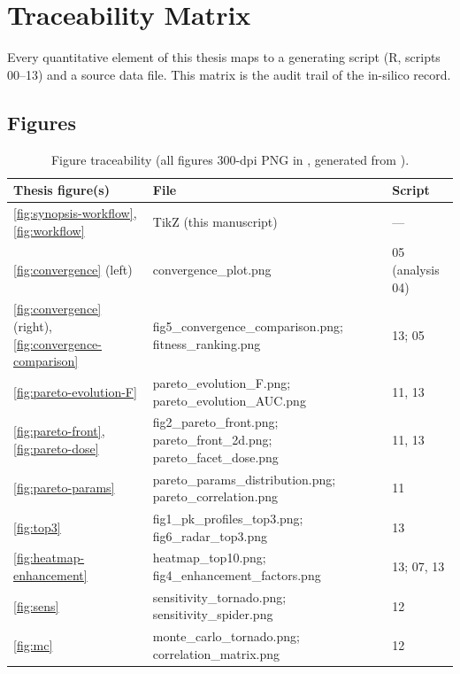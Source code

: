 \chapter{Traceability Matrix}
\label{chap:app-traceability}

Every quantitative element of this thesis maps to a generating script (R, scripts 00--13) and a source data file. This matrix is the audit trail of the in-silico record.

\section{Figures}
\begin{table}[htbp]
\centering
\caption{Figure traceability (all figures 300-dpi PNG in , generated from ).}
\label{tab:trace-figs}
\small
\footnotesize\setlength{\tabcolsep}{4pt}
\begin{tabular}{p{3.1cm}p{7.6cm}p{3.2cm}}
\toprule
Thesis figure(s) & File & Script\\
\midrule
\ref{fig:synopsis-workflow}, \ref{fig:workflow} & TikZ (this manuscript) & ---\\
\ref{fig:convergence} (left) & convergence\_plot.png & 05 (analysis 04)\\
\ref{fig:convergence} (right), \ref{fig:convergence-comparison} & fig5\_convergence\_comparison.png; fitness\_ranking.png & 13; 05\\
\ref{fig:pareto-evolution-F} & pareto\_evolution\_F.png; pareto\_evolution\_AUC.png & 11, 13\\
\ref{fig:pareto-front}, \ref{fig:pareto-dose} & fig2\_pareto\_front.png; pareto\_front\_2d.png; pareto\_facet\_dose.png & 11, 13\\
\ref{fig:pareto-params} & pareto\_params\_distribution.png; pareto\_correlation.png & 11\\
\ref{fig:top3} & fig1\_pk\_profiles\_top3.png; fig6\_radar\_top3.png & 13\\
\ref{fig:heatmap-enhancement} & heatmap\_top10.png; fig4\_enhancement\_factors.png & 13; 07, 13\\
\ref{fig:sens} & sensitivity\_tornado.png; sensitivity\_spider.png & 12\\
\ref{fig:mc} & monte\_carlo\_tornado.png; correlation\_matrix.png & 12\\

\end{tabular}
\end{table}
